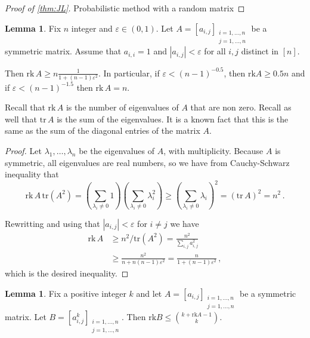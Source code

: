 \documentclass[12pt]{amsart}
\theoremstyle{definition}
\newtheorem{lm}[thm]{Lemma}
\newcommand{\rk}{\mathrm{rk}}
\newcommand{\tr}{\mathrm{tr}}
\begin{document}
\begin{proof}[Proof of \cref{thm:JL}]%
Probabilistic method with a random matrix
\end{proof}

\begin{lm}\label{lm:JL_1}
Fix $n$ integer and $\varepsilon \in (0, 1)$.
Let $A = [a_{i, j}]_{\substack{i = 1, \ldots , n \\ j = 1, \ldots , n}}$ be a symmetric matrix.
Assume that $a_{i, i} = 1$ and $|a_{i, j}| < \varepsilon $ for all $i, j$ distinct in $[n]$.

Then $\rk \,A \geq n \frac{1}{1 + (n-1)\varepsilon^2}$.
In particular, if $\varepsilon < (n-1)^{-0.5}$, then $\rk A \geq 0.5 n$ and if $\varepsilon < (n-1)^{-1.5}$ then $\rk \,A = n$.
\end{lm}

Recall that $\rk \, A$ is the number of eigenvalues of $A$ that are non zero.
Recall as well that $\tr \, A$ is the sum of the eigenvalues.
It is a known fact that this is the same as the sum of the diagonal entries of the matrix $A$.

\begin{proof}
Let $\lambda_1, \ldots, \lambda_n$ be the eigenvalues of $A$, with multiplicity.
Because $A$ is symmetric, all eigenvalues are real numbers, so we have from Cauchy-Schwarz inequality that
$$\rk \, A \,  \tr (A^2)= \left(\sum_{\lambda_i \neq 0} 1 \right)\left( \sum_{\lambda_i \neq 0} \lambda_i^2\right) \geq \left( \sum_{\lambda_i \neq 0} \lambda_i \right)^2 = (\tr\,  A)^2 = n^2 \, . $$

Rewritting and using that $|a_{i, j}| < \varepsilon$ for $i\neq j$ we have 
\begin{align*}
\rk \, A &\geq n^2/\tr (A^2) = \frac{n^2}{\sum_{i, j} a_{i, j}^2} \\
&\geq \frac{n^2}{n + n(n-1)\varepsilon^2} = \frac{n}{1 + (n-1)\varepsilon^2}\, ,
\end{align*}
which is the desired inequality.
\end{proof}

\begin{lm}\label{lm:JL_2}
Fix a positive integer $k$ and let $A = [a_{i, j}]_{\substack{i = 1, \ldots , n \\ j = 1, \ldots , n}}$ be a symmetric matrix.
Let $B = [a_{i, j}^k]_{\substack{i = 1, \ldots , n \\ j = 1, \ldots , n}}$.
Then $\rk B \leq \binom{k + \rk A - 1}{k}$.
\end{lm}
\end{document}
